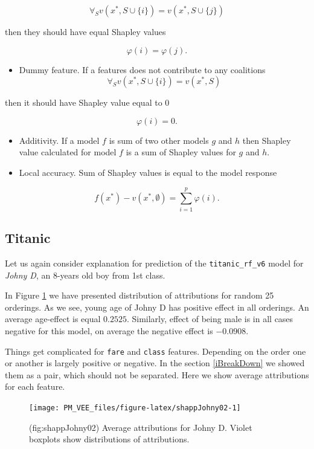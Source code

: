 \documentclass[12pt,]{krantz}
\providecommand{\tightlist}{%
  \setlength{\itemsep}{0pt}\setlength{\parskip}{0pt}}
\theoremstyle{definition}
\theoremstyle{definition}
\theoremstyle{definition}
\theoremstyle{remark}
\begin{document}
\[
\forall_{S} v(x^*, S \cup \{i\}) = v(x^*, S \cup \{j\})
\]

then they should have equal Shapley values

\[
\varphi(i) = \varphi(j).
\]

\begin{itemize}
\tightlist
\item
  Dummy feature. If a features does not contribute to any coalitions \[
  \forall_{S} v(x^*, S \cup \{i\}) = v(x^*, S)
  \]
\end{itemize}

then it should have Shapley value equal to 0

\[
\varphi(i) = 0.
\]

\begin{itemize}
\item
  Additivity. If a model \(f\) is sum of two other models \(g\) and
  \(h\) then Shapley value calculated for model \(f\) is a sum of
  Shapley values for \(g\) and \(h\).
\item
  Local accuracy. Sum of Shapley values is equal to the model response
\end{itemize}

\[
f(x^*) - v(x^*, \emptyset) = \sum_{i=1}^p   \varphi(i). 
\]

\hypertarget{titanic}{%
\subsection{Titanic}\label{titanic}}

Let us again consider explanation for prediction of the
\texttt{titanic\_rf\_v6} model for \emph{Johny D}, an 8-years old boy
from 1st class.

In Figure \ref{fig:shappJohny02} we have presented distribution of
attributions for random 25 orderings. As we see, young age of Johny D
has positive effect in all orderings. An average age-effect is equal
\(0.2525\). Similarly, effect of being male is in all cases negative for
this model, on average the negative effect is \(-0.0908\).

Things get complicated for \texttt{fare} and \texttt{class} features.
Depending on the order one or another is largely positive or negative.
In the section \ref{iBreakDown} we showed them as a pair, which should
not be separated. Here we show average attributions for each feature.

\begin{figure}

{\centering \texttt{[image: PM\_VEE\_files/figure-latex/shappJohny02-1]} 

}

\caption{(fig:shappJohny02) Average attributions for Johny D. Violet boxplots show distributions of attributions.}\label{fig:shappJohny02}
\end{figure}
\end{document}
